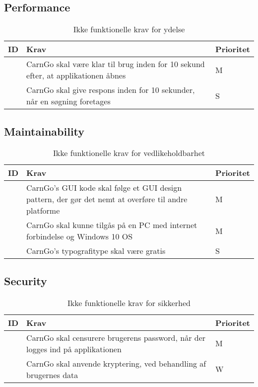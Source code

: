 \documentclass[Kravspecifikation/Kravspec_Main.tex]{subfiles}
\begin{document}
\subsection{Performance}
\begin{table}[H]
\centering
\begin{tabular}{|L{0.1\textwidth}|L{0.6\textwidth}|L{0.15\textwidth}|}
\hline
\textbf{ID} & \textbf{Krav} & \textbf{Prioritet} \\ \hline
\subreq{}  & CarnGo skal være klar til brug inden for 10 sekund efter, at applikationen åbnes & M \\ \hline
\subreq{}  & CarnGo skal give respons inden for 10 sekunder, når en søgning foretages & S \\ \hline
\end{tabular}
\caption{Ikke funktionelle krav for ydelse}
\label{tab:performance}
\end{table}

\subsection{Maintainability}
\begin{table}[H]
\centering
\begin{tabular}{|L{0.1\textwidth}|L{0.6\textwidth}|L{0.15\textwidth}|}
\hline
\textbf{ID} & \textbf{Krav} & \textbf{Prioritet} \\ \hline
\subreq{}  & CarnGo's GUI kode skal følge et GUI design pattern, der gør det nemt at overføre til andre platforme & M \\ \hline
\subreq{}  & CarnGo skal kunne tilgås på en PC med internet forbindelse og Windows 10 OS & M \\ \hline
\subreq{}  & CarnGo's typografitype skal være gratis & S \\ \hline
\end{tabular}
\caption{Ikke funktionelle krav for vedlikeholdbarhet}
\label{tab:vedlikeholdbarhet}
\end{table}

\subsection{Security}
\begin{table}[H]
\centering
\begin{tabular}{|L{0.1\textwidth}|L{0.6\textwidth}|L{0.15\textwidth}|}
\hline
\textbf{ID} & \textbf{Krav} & \textbf{Prioritet} \\ \hline
\subreq{}  & CarnGo skal censurere brugerens password, når der logges ind på applikationen & M \\ \hline
\subreq{}  & CarnGo skal anvende kryptering, ved behandling af brugernes data & W \\ \hline
\end{tabular}
\caption{Ikke funktionelle krav for sikkerhed}
\label{tab:sikkerhet}
\end{table}
\end{document}
